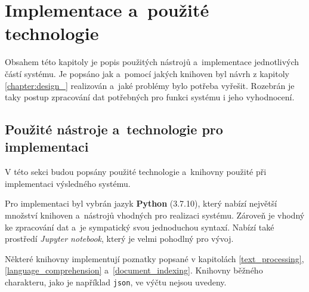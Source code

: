 \chapter{Implementace a~použité technologie}
\label{chapter:implementace}
Obsahem této kapitoly je popis použitých nástrojů a~implementace jednotlivých částí systému. Je popsáno jak a~pomocí jakých knihoven byl návrh z kapitoly \ref{chapter:design_} realizován a~jaké problémy bylo potřeba vyřešit. Rozebrán je taky postup zpracování dat potřebných pro funkci systému i jeho vyhodnocení.

\section{Použité nástroje a~technologie pro implementaci}
\label{pouzite_nastroje}
V této sekci budou popsány použité technologie a~knihovny použité při implementaci výsledného systému.\par
Pro implementaci byl vybrán jazyk \textbf{Python} (3.7.10), který nabízí největší množství knihoven a~nástrojů vhodných pro realizaci systému. Zároveň je vhodný ke zpracování dat a~je sympatický svou jednoduchou syntaxí. Nabízí také prostředí \emph{Jupyter notebook}, který je velmi pohodlný pro vývoj.\par
Některé knihovny implementují poznatky popsané v kapitolách \ref{text_processing}, \ref{language_comprehension} a~\ref{document_indexing}. Knihovny běžného charakteru, jako je například \texttt{json}, ve výčtu nejsou uvedeny.

